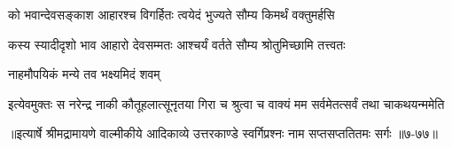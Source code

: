 \twolineshloka
{को भवान्देवसङ्काश आहारश्च विगर्हितः}
{त्वयेदं भुज्यते सौम्य किमर्थं वक्तुमर्हसि} %

\twolineshloka
{कस्य स्यादीदृशो भाव आहारो देवसम्मतः}
{आश्चर्यं वर्तते सौम्य श्रोतुमिच्छामि तत्त्वतः} %

\onelineshloka
{नाहमौपयिकं मन्ये तव भक्ष्यमिदं शवम्} %

\twolineshloka
{इत्येवमुक्तः स नरेन्द्र नाकी कौतूहलात्सूनृतया गिरा च}
{श्रुत्वा च वाक्यं मम सर्वमेतत्सर्वं तथा चाकथयन्ममेति} %


॥इत्यार्षे श्रीमद्रामायणे वाल्मीकीये आदिकाव्ये उत्तरकाण्डे स्वर्गिप्रश्नः नाम सप्तसप्ततितमः सर्गः ॥७-७७॥
